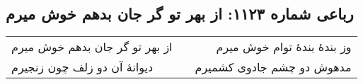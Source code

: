 \begin{center}
\section*{رباعی شماره ۱۱۲۳: از بهر تو گر جان بدهم خوش میرم}
\label{sec:1123}
\begin{longtable}{l p{0.5cm} r}
از بهر تو گر جان بدهم خوش میرم
&&
وز بندهٔ بندهٔ توام خوش میرم
\\
دیوانهٔ آن دو زلف چون زنجیرم
&&
مدهوش دو چشم جادوی کشمیرم
\\
\end{longtable}
\end{center}
